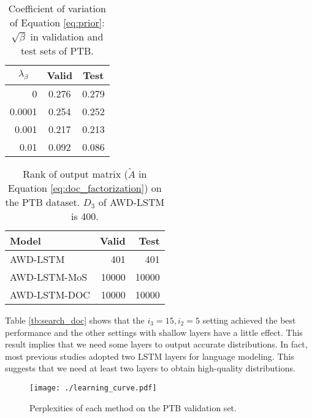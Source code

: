 \documentclass[11pt,a4paper]{article}
\begin{document}
\begin{table}[!t]
  \centering
  \small
  \begin{tabular}{| r | c c |} \hline
  \multicolumn{1}{|c|}{ $\lambda_{\beta}$ } & Valid & Test \\ \hline
  0 & 0.276 & 0.279 \\
  0.0001 & 0.254 & 0.252 \\
  0.001 & 0.217 & 0.213 \\
  0.01 & 0.092 & 0.086 \\ \hline
  \end{tabular}
  \caption{Coefficient of variation of Equation \ref{eq:prior}: $\sqrt{\beta}$ in validation and test sets of PTB.\label{tb:cv}}
\end{table}

\begin{table}[!t]
  \centering
  \small
  \begin{tabular}{| l | r r |} \hline
  Model & Valid & Test \\ \hline
  AWD-LSTM & 401 & 401 \\
  AWD-LSTM-MoS & 10000 & 10000 \\
  AWD-LSTM-DOC & 10000 & 10000 \\ \hline
  \end{tabular}
  \caption{Rank of output matrix ($\tilde{A}$ in Equation \ref{eq:doc_factorization}) on the PTB dataset. $D_{3}$ of AWD-LSTM is 400.\label{tb:output_rank}}
\end{table}

Table \ref{tb:search_doc} shows that the $i_{3}=15, i_{2}=5$ setting achieved the best performance and the other settings with shallow layers have a little effect.
This result implies that we need some layers to output accurate distributions.
In fact, most previous studies adopted two LSTM layers for language modeling.
This suggests that we need at least two layers to obtain high-quality distributions.



\begin{figure}[!t]
  \centering
  \texttt{[image: ./learning\_curve.pdf]}
   \caption{Perplexities of each method on the PTB validation set.\label{fig:learning_curve}}
\end{figure}
\end{document}
